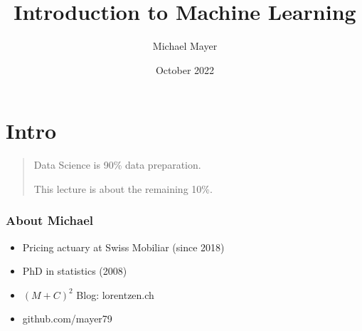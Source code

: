 \documentclass[
    utf8,
    aspectratio=169
]{beamer}  %
\title{Introduction to Machine Learning}
\author{Michael Mayer}
\date{October 2022}
\begin{document}
\frame{\titlepage}


\section{Intro}

\begin{frame}
\begin{quotation}
	\begin{huge}
		\begin{center}
			Data Science is 90\% data preparation.
	
			This lecture is about the remaining 10\%.
		\end{center}
	\end{huge}
\end{quotation}
\end{frame}

\begin{frame}
\frametitle{About Michael}
\begin{itemize}
	\item Pricing actuary at Swiss Mobiliar (since 2018)
	\item PhD in statistics (2008)
	\item $(M+C)^2$ Blog: lorentzen.ch
	\item github.com/mayer79
\end{itemize}
\end{frame}
\end{document}
